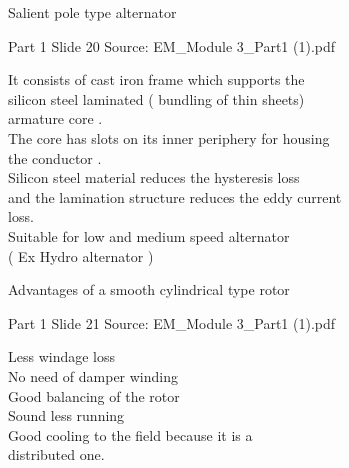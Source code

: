 \documentclass[11pt,a4paper]{article}
\begin{document}
\begin{mdframed}[roundcorner=9pt,backgroundcolor=white,linecolor=anthBlue,linewidth=1pt,innerleftmargin=12pt,innerrightmargin=12pt,innertopmargin=10pt,innerbottommargin=10pt,skipabove=8pt,skipbelow=10pt]
{\HeadingFont\fontsize{15}{18}\selectfont\color{anthDark}Salient pole type alternator\par}
{\color{anthMid}\small Part 1 \textbullet{} Slide 20 \textbullet{} Source: EM\_Module 3\_Part1 (1).pdf\par}
\vspace{0.5em}
{\small
It consists of cast iron frame which supports the\\
silicon steel laminated ( bundling of thin sheets)\\
armature core .\\
The core has slots on its inner periphery for housing\\
the conductor .\\
Silicon steel material reduces the hysteresis loss\\
and the lamination structure reduces the eddy current\\
loss.\\
Suitable for low and medium speed alternator\\
( Ex Hydro alternator )\\

}
\end{mdframed}

\begin{mdframed}[roundcorner=9pt,backgroundcolor=white,linecolor=anthGreen,linewidth=1pt,innerleftmargin=12pt,innerrightmargin=12pt,innertopmargin=10pt,innerbottommargin=10pt,skipabove=8pt,skipbelow=10pt]
{\HeadingFont\fontsize{15}{18}\selectfont\color{anthDark}Advantages of a smooth cylindrical type rotor\par}
{\color{anthMid}\small Part 1 \textbullet{} Slide 21 \textbullet{} Source: EM\_Module 3\_Part1 (1).pdf\par}
\vspace{0.5em}
{\small
Less windage loss\\
No need of damper winding\\
Good balancing of the rotor\\
Sound less running\\
Good cooling to the field because it is a\\
distributed one.\\

}
\end{mdframed}
\end{document}
